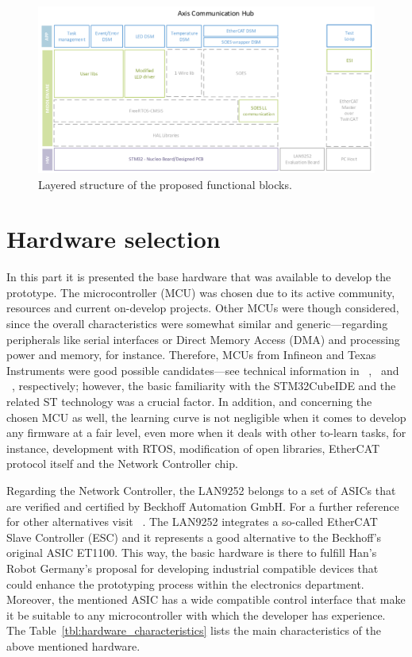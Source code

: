 \begin{figure}[ht]
  \centering
  \includegraphics[width=\textwidth]{imgs/prop-system_struct_v2.png}
  \caption{Layered structure of the proposed functional blocks.}
  \label{fig:sysStruct}
\end{figure}

\section{Hardware selection}

In this part it is presented the base hardware that was available to develop the prototype. The microcontroller (MCU) was chosen
due to its active community, resources and current on-develop projects. Other MCUs were though considered, since the overall characteristics
were somewhat similar and generic---regarding peripherals like serial interfaces or Direct Memory Access (DMA) and processing power and memory, for instance.
Therefore, MCUs from Infineon and 
Texas Instruments were good possible candidates---see technical information in ~\cite{infineon_esc},~\cite{infineon_dramfine} and ~\cite{texasi_esc}, respectively; 
however, the basic familiarity with the STM32CubeIDE and the related ST technology 
was a crucial factor. In addition, and concerning the chosen MCU as well, the learning curve is not negligible when it comes to develop any 
firmware at a fair level, even more when it deals with other to-learn
tasks, for instance, development with RTOS, modification of open libraries, EtherCAT protocol itself and the Network Controller chip.

Regarding the Network Controller, the LAN9252 belongs to a set of ASICs that are verified and certified by Beckhoff Automation GmbH. For a further
reference for other alternatives visit ~\cite{beckhoff_esccomparison}. The LAN9252 integrates a so-called EtherCAT Slave Controller (ESC) and it represents a good 
alternative to the Beckhoff's original ASIC ET1100. This way, the basic hardware is there to fulfill Han's Robot Germany's
proposal for developing industrial compatible devices that could enhance the prototyping process within the electronics department. 
Moreover, the mentioned ASIC has a wide compatible control interface that make it be suitable to any microcontroller with which 
the developer has experience. The Table~\ref{tbl:hardware_characteristics} lists the main characteristics of the above mentioned hardware.

